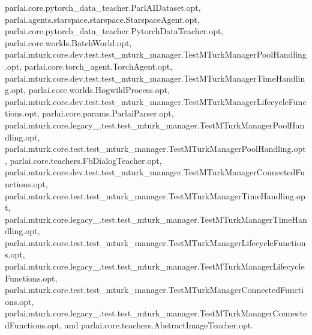 parlai.\+core.\+pytorch\+\_\+data\+\_\+teacher.\+Parl\+A\+I\+Dataset.\+opt, parlai.\+agents.\+starspace.\+starspace.\+Starspace\+Agent.\+opt, parlai.\+core.\+pytorch\+\_\+data\+\_\+teacher.\+Pytorch\+Data\+Teacher.\+opt, parlai.\+core.\+worlds.\+Batch\+World.\+opt, parlai.\+mturk.\+core.\+dev.\+test.\+test\+\_\+mturk\+\_\+manager.\+Test\+M\+Turk\+Manager\+Pool\+Handling.\+opt, parlai.\+core.\+torch\+\_\+agent.\+Torch\+Agent.\+opt, parlai.\+mturk.\+core.\+dev.\+test.\+test\+\_\+mturk\+\_\+manager.\+Test\+M\+Turk\+Manager\+Time\+Handling.\+opt, parlai.\+core.\+worlds.\+Hogwild\+Process.\+opt, parlai.\+mturk.\+core.\+dev.\+test.\+test\+\_\+mturk\+\_\+manager.\+Test\+M\+Turk\+Manager\+Lifecycle\+Functions.\+opt, parlai.\+core.\+params.\+Parlai\+Parser.\+opt, parlai.\+mturk.\+core.\+legacy\+\_.\+test.\+test\+\_\+mturk\+\_\+manager.\+Test\+M\+Turk\+Manager\+Pool\+Handling.\+opt, parlai.\+mturk.\+core.\+test.\+test\+\_\+mturk\+\_\+manager.\+Test\+M\+Turk\+Manager\+Pool\+Handling.\+opt, parlai.\+core.\+teachers.\+Fb\+Dialog\+Teacher.\+opt, parlai.\+mturk.\+core.\+dev.\+test.\+test\+\_\+mturk\+\_\+manager.\+Test\+M\+Turk\+Manager\+Connected\+Functions.\+opt, parlai.\+mturk.\+core.\+test.\+test\+\_\+mturk\+\_\+manager.\+Test\+M\+Turk\+Manager\+Time\+Handling.\+opt, parlai.\+mturk.\+core.\+legacy\+\_.\+test.\+test\+\_\+mturk\+\_\+manager.\+Test\+M\+Turk\+Manager\+Time\+Handling.\+opt, parlai.\+mturk.\+core.\+test.\+test\+\_\+mturk\+\_\+manager.\+Test\+M\+Turk\+Manager\+Lifecycle\+Functions.\+opt, parlai.\+mturk.\+core.\+legacy\+\_.\+test.\+test\+\_\+mturk\+\_\+manager.\+Test\+M\+Turk\+Manager\+Lifecycle\+Functions.\+opt, parlai.\+mturk.\+core.\+test.\+test\+\_\+mturk\+\_\+manager.\+Test\+M\+Turk\+Manager\+Connected\+Functions.\+opt, parlai.\+mturk.\+core.\+legacy\+\_.\+test.\+test\+\_\+mturk\+\_\+manager.\+Test\+M\+Turk\+Manager\+Connected\+Functions.\+opt, and parlai.\+core.\+teachers.\+Abstract\+Image\+Teacher.\+opt.

